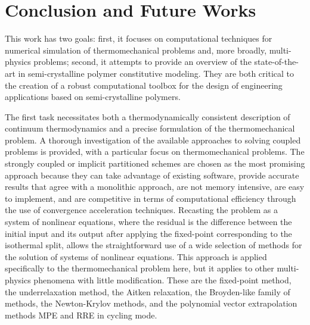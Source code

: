 \chapter{Conclusion and Future Works} \label{ch:conclusions}

This work has two goals: first, it focuses on computational techniques for numerical simulation of thermomechanical problems and, more broadly, multi-physics problems; second, it attempts to provide an overview of the state-of-the-art in semi-crystalline polymer constitutive modeling.
They are both critical to the creation of a robust computational toolbox for the design of engineering applications based on semi-crystalline polymers.

The first task necessitates both a thermodynamically consistent description of continuum thermodynamics and a precise formulation of the thermomechanical problem.
A thorough investigation of the available approaches to solving coupled problems is provided, with a particular focus on thermomechanical problems.
The strongly coupled or implicit partitioned schemes are chosen as the most promising approach because they can take advantage of existing software, provide accurate results that agree with a monolithic approach, are not memory intensive, are easy to implement, and are competitive in terms of computational efficiency through the use of convergence acceleration techniques.
Recasting the problem as a system of nonlinear equations, where the residual is the difference between the initial input and its output after applying the fixed-point corresponding to the isothermal split, allows the straightforward use of a wide selection of methods for the solution of systems of nonlinear equations.
This approach is applied specifically to the thermomechanical problem here, but it applies to other multi-physics phenomena with little modification.
These are the fixed-point method, the underrelaxation method, the Aitken relaxation, the Broyden-like family of methods, the Newton-Krylov methods, and the polynomial vector extrapolation methods MPE and RRE in cycling mode.

